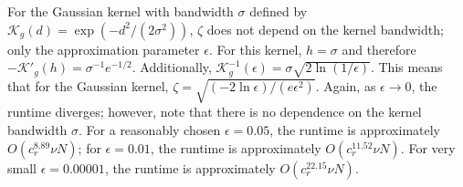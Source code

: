 

For the Gaussian kernel with bandwidth $\sigma$ defined by $\mathcal{K}_g(d) =
\exp(-d^2 / (2 \sigma^2))$, $\zeta$ does not
depend on the kernel bandwidth; only
the approximation parameter $\epsilon$.  For this kernel, $h = \sigma$ and
therefore $-\mathcal{K}'_g(h) = \sigma^{-1} e^{-1 / 2}$.  Additionally,
$\mathcal{K}_g^{-1}(\epsilon) = \sigma \sqrt{2 \ln (1 / \epsilon)}$.  This means
that for the Gaussian kernel, $\zeta = \sqrt{(-2 \ln \epsilon) / (e
\epsilon^2)}$.  Again, as $\epsilon \to 0$, the
runtime diverges; however, note that there is no dependence on the kernel
bandwidth $\sigma$.  For a reasonably chosen $\epsilon = 0.05$, the runtime is
approximately $O(c_r^{8.89} \nu N)$; for $\epsilon = 0.01$, the runtime is
approximately $O(c_r^{11.52} \nu N)$.  For very small $\epsilon = 0.00001$, the
runtime is approximately $O(c_r^{22.15} \nu N)$.


%
%
%

